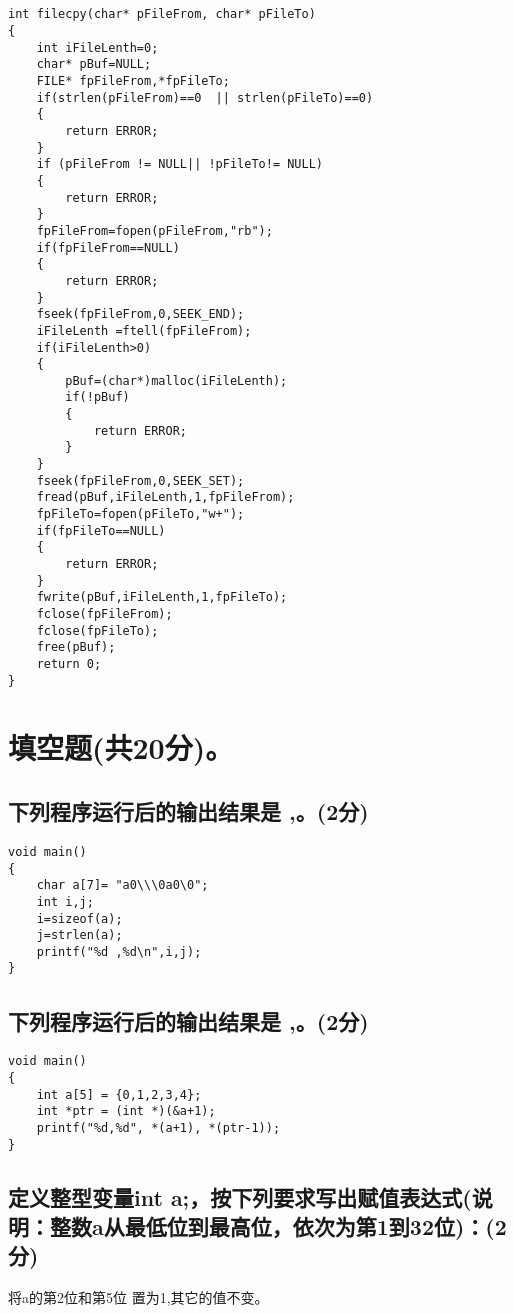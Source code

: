 ﻿\documentclass  [11pt,twocolumn]{article}
\begin{document}
\subsection{}

\begin{lstlisting}
int filecpy(char* pFileFrom, char* pFileTo)
{
    int iFileLenth=0;
    char* pBuf=NULL;
    FILE* fpFileFrom,*fpFileTo; 
    if(strlen(pFileFrom)==0  || strlen(pFileTo)==0)
    {
        return ERROR;
    }
    if (pFileFrom != NULL|| !pFileTo!= NULL)
    {  
        return ERROR; 
    }
    fpFileFrom=fopen(pFileFrom,"rb");
    if(fpFileFrom==NULL)
    {
        return ERROR;
    }
    fseek(fpFileFrom,0,SEEK_END);
    iFileLenth =ftell(fpFileFrom);
    if(iFileLenth>0)
    {
        pBuf=(char*)malloc(iFileLenth);
        if(!pBuf) 
        {
            return ERROR; 
        }
    }
    fseek(fpFileFrom,0,SEEK_SET);
    fread(pBuf,iFileLenth,1,fpFileFrom);
    fpFileTo=fopen(pFileTo,"w+");
    if(fpFileTo==NULL)
    {
        return ERROR; 
    }
    fwrite(pBuf,iFileLenth,1,fpFileTo);
    fclose(fpFileFrom);
    fclose(fpFileTo);
    free(pBuf);
    return 0;
}
\end{lstlisting}

\section{填空题(共20分)。}

\subsection{下列程序运行后的输出结果是 \myblank{5em},\myblank{5em}。(2分)}
\begin{lstlisting}
void main() 
{ 
    char a[7]= "a0\\\0a0\0"; 
    int i,j; 
    i=sizeof(a);
    j=strlen(a); 
    printf("%d ,%d\n",i,j); 
}
\end{lstlisting}

\subsection{下列程序运行后的输出结果是 \myblank{5em},\myblank{5em}。(2分)}
\begin{lstlisting}
void main()
{
    int a[5] = {0,1,2,3,4};
    int *ptr = (int *)(&a+1);
    printf("%d,%d", *(a+1), *(ptr-1));
}
\end{lstlisting}

\subsection{定义整型变量int a;，按下列要求写出赋值表达式(说明：整数a从最低位到最高位，依次为第1到32位)：(2分)}
将a的第2位和第5位 置为1,其它的值不变\myblank{15em}。
\end{document}
